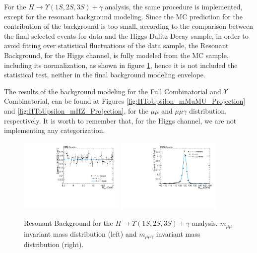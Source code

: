 For the $H \rightarrow \Upsilon(1S,2S,3S) + \gamma$ analysis, the same procedure is implemented, except for the resonant background modeling. Since the MC prediction for the contribution of the background is too small, according to the comparison between the final selected events for data and the Higgs Dalitz Decay sample, in order to avoid fitting over statistical fluctuations of the data sample, the Resonant Background, for the Higgs channel, is fully modeled from the MC sample, including its normalization, as shown in figure \ref{fig:HToUpsilon_PeakingBackground}, hence it is not included the statistical test, neither in the final background modeling envelope.

The results of the background modeling for the Full Combinatorial and $\Upsilon$ Combinatorial, can be found at Figures \ref{fig:HToUpsilon_mMuMU_Projection} and \ref{fig:HToUpsilon_mHZ_Projection}, for the $\mu\mu$ and $\mu\mu\gamma$ distribution, respectively. It is worth to remember that, for the Higgs channel, we are not implementing any categorization.


\begin{figure}[!htbp]
\begin{center}
\includegraphics[width=0.45\textwidth]{figures_and_tables/fitPlotFiles2D/HToUpsilonPhotonSignalAndBackgroundFit/mMuMNU_HToUpsilon1SPhotonSignalAndBackgroundFit_PeakingBackground_Cat0}\hspace*{1.cm}
\includegraphics[width=0.45\textwidth]{figures_and_tables/fitPlotFiles2D/HToUpsilonPhotonSignalAndBackgroundFit/mHZ_HToUpsilon1SPhotonSignalAndBackgroundFit_PeakingBackground_Cat0}\hspace*{1.cm}
\end{center}\vspace*{-.5cm}
\caption{Resonant Background for the $H \rightarrow \Upsilon(1S,2S,3S) +\gamma$ analysis. $m_{\mu\mu}$ invariant mass distribution (left) and $m_{\mu\mu\gamma}$ invariant mass distribution (right).}
\label{fig:HToUpsilon_PeakingBackground}
\end{figure}


